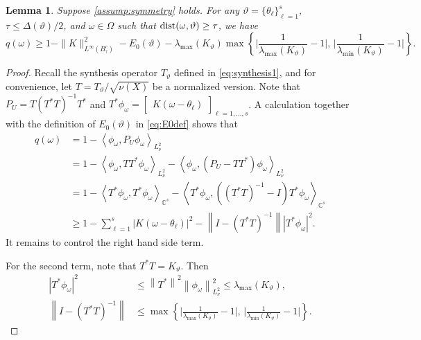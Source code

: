 \documentclass[11pt]{article}
\newtheorem{lemma}[theorem]{Lemma}
\theoremstyle{definition}
\numberwithin{theorem}{section}
\numberwithin{lemma}{section}
\numberwithin{equation}{section}
\def\C{\mathbb{C}}
\def\dist{{\rm dist}}
\newcommand{\domain}{\Omega}
\newcommand{\sampset}{X}
\newcommand{\norm}[1]{{\left\|#1\right\|}}
\newcommand{\inner}[1]{{\left\langle#1\right\rangle}}
\numberwithin{equation}{section}
\begin{document}
	
	\begin{lemma}\label{lem:approx}
	Suppose \cref{assump:symmetry} holds. For any $\vartheta=\{\theta_\ell\}_{\ell=1}^s$, $\tau\leq \Delta(\vartheta)/2$, and $\omega\in \domain$ such that $\dist(\omega,\vartheta)\geq \tau$, we have
	$$
	q(\omega) \geq 1 - \|K\|_{L^\infty(B_\tau^c)}^2 - E_0(\vartheta) - \lambda_{\max}(K_\vartheta) \max\left\{ \Big| \frac 1 {\lambda_{\max}(K_\vartheta)}-1\Big|,\, \Big|\frac 1 {\lambda_{\min}(K_\vartheta)} - 1\Big| \right\}.
	$$
	\end{lemma}
	
	\begin{proof}
	Recall the synthesis operator $T_\vartheta$ defined in \eqref{eq:synthesis1}, and for convenience, let $T=T_\vartheta/\sqrt{\nu(\sampset)}$ be a normalized version. Note that $P_U= T(T^*T)^{-1} T^*$ and $T^* \phi_\omega
	= \begin{bmatrix}
		K(\omega-\theta_\ell)
	\end{bmatrix}_{\ell=1,\dots,s}
	$. A calculation together with the definition of $E_0(\vartheta)$ in \eqref{eq:E0def} shows that
	\begin{equation*}
		\begin{split}
			q(\omega)&=1- \inner{\phi_\omega, P_U \phi_\omega}_{L^2_\nu} \\
			&=1- \inner{\phi_\omega, TT^* \phi_\omega}_{L^2_\nu} - \inner{\phi_\omega,  (P_U-TT^*) \phi_\omega}_{L^2_\nu} \\
			&=1 - \inner{T^*\phi_\omega, T^* \phi_\omega}_{\C^s} - \inner{T^* \phi_\omega, \left( (T^*T)^{-1}-I \right) T^*\phi_\omega}_{\C^s} \\
			&\geq 1-\sum_{\ell=1}^s |K(\omega-\theta_\ell)|^2 - \norm{I-(T^*T)^{-1}} | T^*\phi_\omega|^2.
		\end{split}
	\end{equation*}
	It remains to control the right hand side term. 
	
	For the second term, note that $T^*T=K_\vartheta$. Then
	\begin{align*}
		| T^*\phi_\omega|^2
		&\leq \norm{T^*}^2 \norm{\phi_\omega}_{L^2_\nu}^2
		\leq \lambda_{\max}(K_\vartheta), \\
		\norm{I-(T^*T)^{-1}} 
		&\leq \max\left\{ \Big| \frac 1 {\lambda_{\max}(K_\vartheta)}-1\Big|,\, \Big|\frac 1 {\lambda_{\min}(K_\vartheta)} - 1\Big| \right\}.
	\end{align*}
	

\end{proof}
\end{document}
